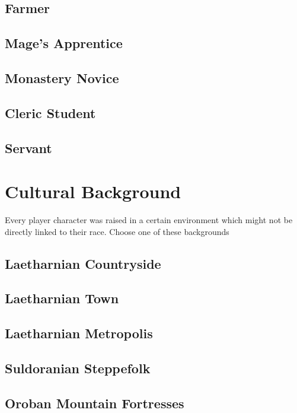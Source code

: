 \section{Farmer}

\section{Mage's Apprentice}

\section{Monastery Novice}

\section{Cleric Student}

\section{Servant}


\chapter{Cultural Background}
Every player character was raised in a certain environment which might not be directly linked to their race. Choose one of these backgrounds\\

\section{Laetharnian Countryside}

\section{Laetharnian Town}

\section{Laetharnian Metropolis}

\section{Suldoranian Steppefolk}

\section{Oroban Mountain Fortresses}

